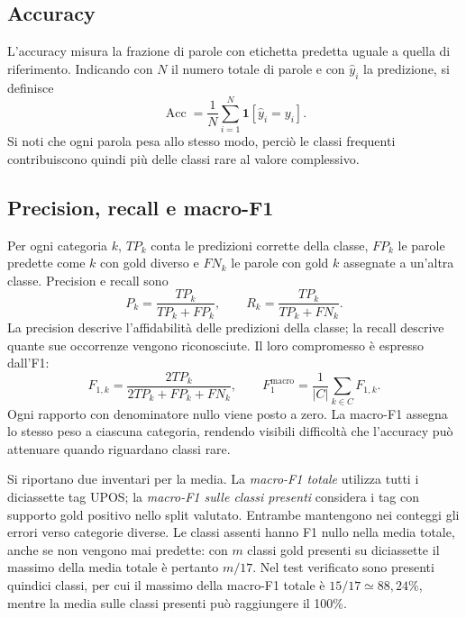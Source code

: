 \documentclass[12pt,a4paper]{report}
\begin{document}
\subsection{Accuracy}
L'accuracy misura la frazione di parole con etichetta predetta uguale a quella di riferimento. Indicando con $N$ il numero totale di parole e con $\hat y_i$ la predizione, si definisce
\begin{equation}
\operatorname{Acc}=\frac{1}{N}\sum_{i=1}^{N}\mathbf{1}[\hat y_i=y_i].
\end{equation}
Si noti che ogni parola pesa allo stesso modo, perciò le classi frequenti contribuiscono quindi più delle classi rare al valore complessivo.

\subsection{Precision, recall e macro-F1}
Per ogni categoria $k$, $TP_k$ conta le predizioni corrette della classe, $FP_k$ le parole predette come $k$ con gold diverso e $FN_k$ le parole con gold $k$ assegnate a un'altra classe. Precision e recall sono
\begin{equation}
 P_k=\frac{TP_k}{TP_k+FP_k},\qquad
 R_k=\frac{TP_k}{TP_k+FN_k}.
\end{equation}
La precision descrive l'affidabilità delle predizioni della classe; la recall descrive quante sue occorrenze vengono riconosciute. Il loro compromesso è espresso dall'F1:
\begin{equation}
 F_{1,k}=\frac{2TP_k}{2TP_k+FP_k+FN_k},\qquad
 F_1^{\mathrm{macro}}=\frac{1}{|C|}\sum_{k\in C}F_{1,k}.
\end{equation}
Ogni rapporto con denominatore nullo viene posto a zero. La macro-F1 assegna lo stesso peso a ciascuna categoria, rendendo visibili difficoltà che l'accuracy può attenuare quando riguardano classi rare.

Si riportano due inventari per la media. La \emph{macro-F1 totale} utilizza tutti i diciassette tag UPOS; la \emph{macro-F1 sulle classi presenti} considera i tag con supporto gold positivo nello split valutato. Entrambe mantengono nei conteggi gli errori verso categorie diverse. Le classi assenti hanno F1 nullo nella media totale, anche se non vengono mai predette: con $m$ classi gold presenti su diciassette il massimo della media totale è pertanto $m/17$. Nel test verificato sono presenti quindici classi, per cui il massimo della macro-F1 totale è $15/17\simeq88{,}24\%$, mentre la media sulle classi presenti può raggiungere il 100\%.
\end{document}
